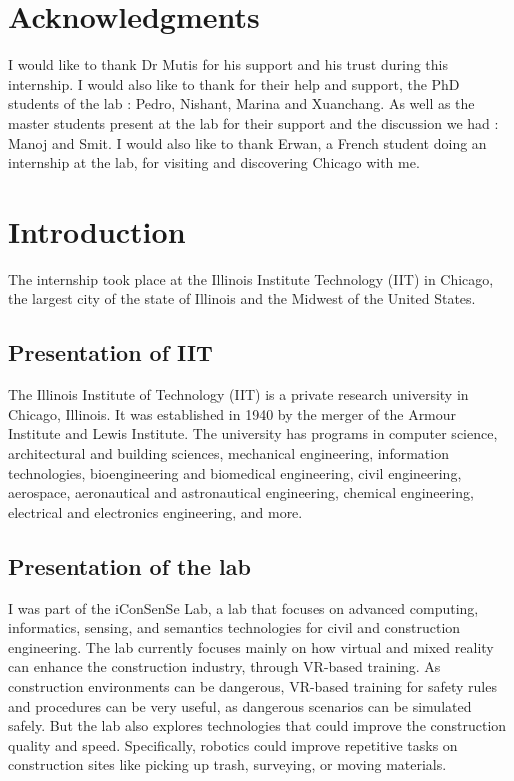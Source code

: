 \documentclass[12pt]{article}
\begin{document}
\newpage
\section*{Acknowledgments}

    I would like to thank Dr Mutis for his support and his trust during this internship. I would also like to thank for their help and support, the PhD students of the lab : Pedro, Nishant, Marina and Xuanchang. As well as the master students present at the lab for their support and the discussion we had : Manoj and Smit. I would also like to thank Erwan, a French student doing an internship at the lab, for visiting and discovering Chicago with me.

    
\newpage
\thispagestyle{empty}
\mbox{}
\newpage
\thispagestyle{empty}
{\small \tableofcontents}

\newpage
\thispagestyle{empty}
\mbox{}

\section{Introduction}

    The internship took place at the Illinois Institute Technology (IIT) in Chicago, the largest city of the state of Illinois and the Midwest of the United States.

    \subsection{Presentation of IIT}

    The Illinois Institute of Technology (IIT) is a private research university in Chicago, Illinois. It was established in 1940 by the merger of the Armour Institute and Lewis Institute. The university has programs in computer science, architectural and building sciences, mechanical engineering, information technologies, bioengineering and biomedical engineering, civil engineering, aerospace, aeronautical and astronautical engineering, chemical engineering, electrical and electronics engineering, and more.


    \subsection{Presentation of the lab}

    I was part of the iConSenSe Lab, a lab that focuses on advanced computing, informatics, sensing, and semantics technologies for civil and construction engineering. The lab currently focuses mainly on how virtual and mixed reality can enhance the construction industry, through VR-based training. As construction environments can be dangerous, VR-based training for safety rules and procedures can be very useful, as dangerous scenarios can be simulated safely.
    But the lab also explores technologies that could improve the construction quality and speed. Specifically, robotics could improve repetitive tasks on construction sites like picking up trash, surveying, or moving materials.
\end{document}
